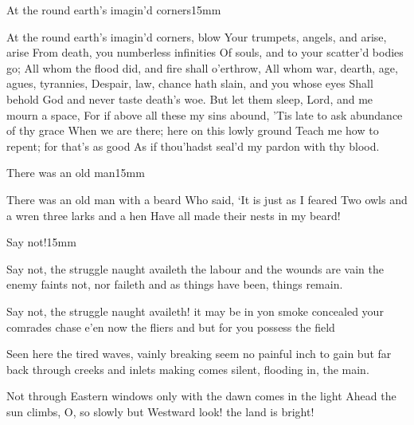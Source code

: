 \begin{poem}{At the round earth's imagin'd corners}{15mm}
  \begin{stanza}
    At the round earth's imagin'd corners, blow
Your trumpets, angels, and arise, arise
From death, you numberless infinities
Of souls, and to your scatter'd bodies go;
All whom the flood did, and fire shall o'erthrow,
All whom war, dearth, age, agues, tyrannies,
Despair, law, chance hath slain, and you whose eyes
Shall behold God and never taste death's woe.
But let them sleep, Lord, and me mourn a space,
For if above all these my sins abound,
'Tis late to ask abundance of thy grace
When we are there; here on this lowly ground
Teach me how to repent; for that's as good
As if thou'hadst seal'd my pardon with thy blood.
\end{stanza}
\end{poem}

\begin{poem}{There was an old man}{15mm}
  \begin{stanza}
    There was an old man with a beard
    Who said, `It is just as I feared
    \qquad Two owls and a wren
    \qquad three larks and a hen
    Have all made their nests in my beard!
  \end{stanza}
\end{poem}

\begin{poem}{Say not!}{15mm}
  \begin{stanza}
    Say not, the struggle naught availeth
    \qquad the labour and the wounds are vain
    the enemy faints not, nor faileth
    \qquad and as things have been, things remain.
  \end{stanza}
  \begin{stanza}
    Say not, the struggle naught availeth!
    \qquad it may be in yon smoke concealed
    your comrades chase e'en now the fliers
    \qquad and but for you possess the field
  \end{stanza}
  \begin{stanza}
    Seen here the tired waves, vainly breaking
    \qquad seem no painful inch to gain
    but far back through creeks and inlets making
    \qquad comes silent, flooding in, the main.
  \end{stanza}
  \begin{stanza}
    Not through Eastern windows only
    \qquad with the dawn comes in the light
    Ahead the sun climbs, O, so slowly
    \qquad but Westward look! the land is bright!
  \end{stanza}
\end{poem}

